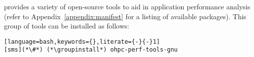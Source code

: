 \OHPC{} provides a variety of open-source tools to aid in application 
performance analysis (refer to Appendix~\ref{appendix:manifest} for a listing
of available packages). This group of tools can be installed as follows:

\begin{lstlisting}[language=bash,keywords={},literate={-}{-}1]
[sms](*\#*) (*\groupinstall*) ohpc-perf-tools-gnu
\end{lstlisting}


